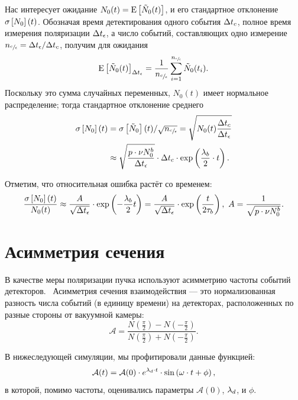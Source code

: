 Нас интересует ожидание ${N_0(t) = \Xpct{\tilde{N}_0(t)}}$, и его
стандартное отклонение $\SD{N_0}(t)$. Обозначая время детектирования одного
события $\Delta t_{c}$, полное время измерения поляризации $\Delta t_{\epsilon}$, а число событий, составляющих
одно измерение ${n_{\sfrac{c}{\epsilon}}} = \Delta t_{\epsilon}/\Delta t_{c}$, получим для ожидания
\begin{equation*}
\Xpct{\tilde{N}_0(t)}_{\dtm} = \frac{1}{\Ncm}\sum_{i=1}^\Ncm \tilde{N}_0(t_i).
\end{equation*}
Поскольку это сумма случайных переменных, $N_0(t)$ имеет нормальное
распределение; тогда стандартное отклонение среднего %
\begin{align*}
\SD{N_0}(t) & = \SD{\tilde{N}_0}(t)/\sqrt{\Ncm} = \sqrt{N_0(t)\frac{\dtc}{\dtm}}            \\
& \approx \sqrt{\frac{p\cdot\nu N_0^b}{\dtm}}\cdot\dtc \cdot\exp\bkt{\frac{\lamb}{2}\cdot t}.
\end{align*}
\newcommand{\Acoef}{\frac{1}{\sqrt{p\cdot\nu N_0^b}}}

Отметим, что относительная ошибка растёт со временем:
\begin{equation}\label{eq:MeasRelErr}
\frac{\SD{N_0}(t)}{N_0(t)} \approx \frac{A}{\sqrt{\dtm}}\cdot\exp\bkt{-\frac{\lamb}{2}t} = \frac{A}{\sqrt{\dtm}}\cdot\exp\bkt{\frac{t}{2\LTb}},~ A=\Acoef.
\end{equation}

\section{Асимметрия сечения}
\newcommand{\Asym}{\mathcal{A}}
В качестве меры поляризации пучка используют асимметрию частоты
событий детекторов.~\cite[стр.~17]{Eversmann:Thesis} Асимметрия сечения
взаимодействия --- это нормализованная разность числа событий (в
единицу времени) на
детекторах, расположенных по разные стороны от вакуумной камеры:
\begin{equation}\label{eq:AsymDef}
\Asym = \frac{N(\frac\pi2) - N(-\frac\pi2)}{N(\frac\pi2)+N(-\frac\pi2)}.
\end{equation}

В нижеследующей симуляции, мы профитировали данные функцией:
\begin{equation}\label{eq:xFOM}
\Asym(t) = \Asym(0)\cdot e^{\lamd\cdot t}\cdot\sin\bkt{\w\cdot t + \phi},
\end{equation}
в которой, помимо частоты, оценивались параметры $\Asym(0)$, $\lambda_d$, и $\phi$. 

